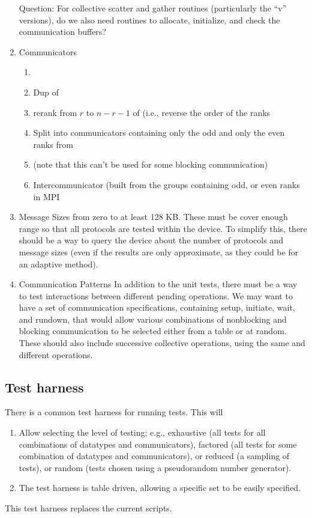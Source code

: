 \documentclass{article}
\begin{document}
\begin{enumerate}
     Question:  For collective scatter and gather routines
     (particularly the ``v'' versions), do we also need routines to
     allocate, initialize, and check the communication buffers?

\item Communicators
    \begin{enumerate}
    \item {}
    \item Dup of 
    \item rerank from $r$ to $n-r-1$ of  (i.e.,
    reverse the order of the ranks
    \item Split into communicators containing only the odd and only
    the even ranks from 
    \item {} (note that this can't be used for some
    blocking communication)
    \item Intercommunicator (built from the groups containing odd,
or even ranks in MPI 
    \end{enumerate}

\item Message Sizes from zero to at least 128 KB.  These must be cover
enough range so that all protocols are tested within the device.  To
simplify this, there should be a way to query the device about the
number of protocols and message sizes (even if the results are only
approximate, as they could be for an adaptive method).

\item Communication Patterns
In addition to the unit tests, there must be a way to test
interactions between different pending operations.  We may want to
have a set of communication specifications, containing setup,
initiate, wait, and rundown, that would allow various combinations of
nonblocking and blocking communication to be selected either from a
table or at random.  These should also include successive collective
operations, using the same and different operations.

\end{enumerate}

\subsection{Test harness}
There is a common test harness for running tests.  This will
\begin{enumerate}
\item Allow selecting the level of testing; e.g., exhaustive (all
tests for all combinations of datatypes and communicators), factored
(all tests for some combination of datatypes and communicators), or
reduced (a sampling of tests), or random (tests chosen using a
pseudorandom number generator).  

\item The test harness is table driven, allowing a specific set to be
easily specified.  
\end{enumerate}
This test harness replaces the current  scripts.
\end{document}
